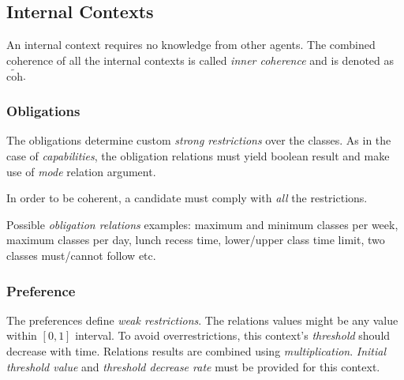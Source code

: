 \documentclass[../ThesisDoc]{subfiles}
\begin{document}
\def\cohi{\mathrm{\widetilde{coh}}}

\subsection{Internal Contexts}

An internal context requires no knowledge from other agents.
The combined coherence of all the internal contexts is called
\emph{inner coherence} and is denoted as $\cohi$.

\subsubsection{Obligations}

The obligations determine custom \emph{strong restrictions} over the classes.
As in the case of \emph{capabilities}, the obligation relations must yield
boolean result and make use of \emph{mode} relation argument.

In order to be coherent, a candidate must comply with \emph{all} the restrictions.

\medskip

Possible \emph{obligation relations} examples:
maximum and minimum classes per week, maximum classes per day,
lunch recess time, lower/upper class time limit, two classes must/cannot follow etc.


\subsubsection{Preference}

The preferences define \emph{weak restrictions}. The relations values might be any
value within $[0,1]$ interval. To avoid overrestrictions, this context's \emph{threshold}
should decrease with time. Relations results are combined using \emph{multiplication}.
\emph{Initial threshold value} and \emph{threshold decrease rate} must be
provided for this context.

\end{document}
